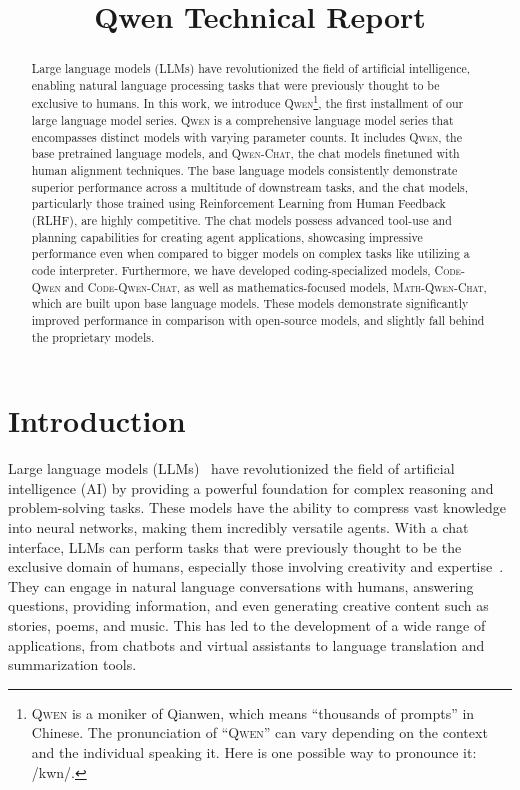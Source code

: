 \title{Qwen Technical Report}

\begin{abstract}
Large language models (LLMs) have revolutionized the field of artificial intelligence, enabling natural language processing tasks that were previously thought to be exclusive to humans. In this work, we introduce \textsc{Qwen}\footnote{\textsc{Qwen} is a moniker of Qianwen, which means ``thousands of prompts'' in Chinese. The pronunciation of ``\textsc{Qwen}'' can vary depending on the context and the individual speaking it. Here is one possible way to pronounce it: /kwn/.}, the first installment of our large language model series. \textsc{Qwen} is a comprehensive language model series that encompasses distinct models with varying parameter counts. It  includes \textsc{Qwen}, the base pretrained language models, and \textsc{Qwen-Chat}, the chat models finetuned with human alignment techniques. The base language models consistently demonstrate superior performance across a multitude of downstream tasks, and the chat models, particularly those trained using Reinforcement Learning from Human Feedback (RLHF), are highly competitive. The chat models possess advanced tool-use and planning capabilities for creating agent applications, showcasing impressive performance even when compared to bigger models on complex tasks like utilizing a code interpreter. Furthermore, we have developed coding-specialized models, \textsc{Code-Qwen} and \textsc{Code-Qwen-Chat}, as well as mathematics-focused models, \textsc{Math-Qwen-Chat}, which are built upon base language models. These models demonstrate significantly improved performance in comparison with open-source models, and slightly fall behind the proprietary models.
\end{abstract}

\section{Introduction}
\label{sec:intro}

Large language models (LLMs)~\citep{gpt, bert, t5, gpt3, gpt4, palm, palm2, LaMDA, llama, llama2} have revolutionized the field of artificial intelligence (AI) by providing a powerful foundation for complex reasoning and problem-solving tasks. These models have the ability to compress vast knowledge into neural networks, making them incredibly versatile agents. With a chat interface, LLMs can perform tasks that were previously thought to be the exclusive domain of humans, especially those involving creativity and expertise~\citep{chatgpt,instructgpt,palm2,bard,claude,claude2}. They can engage in natural language conversations with humans, answering questions, providing information, and even generating creative content such as stories, poems, and music. This has led to the development of a wide range of applications, from chatbots and virtual assistants to language translation and summarization tools.

